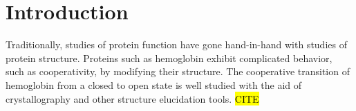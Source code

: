 \documentclass[../AdvancementSummary.tex]{subfiles}
\begin{document}
%
%


%
%

\section{Introduction}

Traditionally, studies of protein function have gone hand-in-hand with studies of protein structure. Proteins such as hemoglobin exhibit complicated behavior, such as cooperativity, by modifying their structure. The cooperative transition of hemoglobin from a closed to open state is well studied with the aid of crystallography and other structure elucidation tools. \hl{CITE} 
\end{document}
